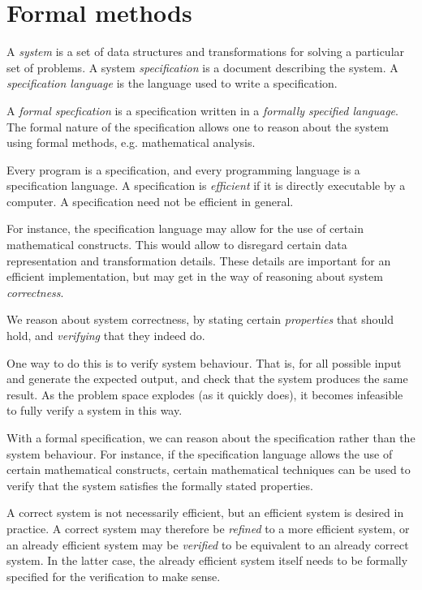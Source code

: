 \section*{Formal methods}


A \emph{system} is a set of data structures and transformations for solving a
particular set of problems. A system \emph{specification} is a document
describing the system. A \emph{specification language} is the language used to
write a specification.

A \emph{formal specfication} is a specification written in a \emph{formally
specified language}. The formal nature of the specification allows one to
reason about the system using formal methods, e.g. mathematical analysis.

Every program is a specification, and every programming language is a
specification language. A specification is \emph{efficient} if it is directly
executable by a computer. A specification need not be efficient in general.

For instance, the specification language may allow for the use of certain
mathematical constructs. This would allow to disregard certain data
representation and transformation details. These details are important for an
efficient implementation, but may get in the way of reasoning about system
\emph{correctness}.

We reason about system correctness, by stating certain \emph{properties} that
should hold, and \emph{verifying} that they indeed do.

One way to do this is to verify system behaviour. That is, for all possible
input and generate the expected output, and check that the system produces the
same result. As the problem space explodes (as it quickly does), it becomes
infeasible to fully verify a system in this way.

With a formal specification, we can reason about the specification rather than
the system behaviour. For instance, if the specification language allows the
use of certain mathematical constructs, certain mathematical techniques can be
used to verify that the system satisfies the formally stated properties.

A correct system is not necessarily efficient, but an efficient system is
desired in practice. A correct system may therefore be \emph{refined} to a more
efficient system, or an already efficient system may be \emph{verified} to be
equivalent to an already correct system. In the latter case, the already
efficient system itself needs to be formally specified for the verification to
make sense.

